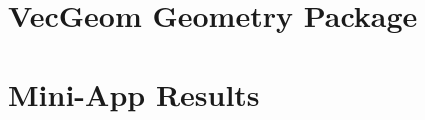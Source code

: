 \documentclass{webofc}
\begin{document}

\section{VecGeom Geometry Package}
\label{sec:vecgeom}

\section{Mini-App Results}
\label{sec:miniapp}


\end{document}
